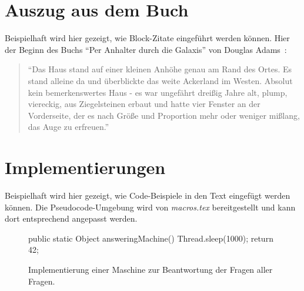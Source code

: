 \begin{appendices}
	\chapter{Auszug aus dem Buch}
	Beispielhaft wird hier gezeigt, wie Block-Zitate eingeführt werden können. Hier der Beginn des Buchs "`Per Anhalter durch die Galaxis"' von Douglas Adams~\cite{adams1998anhalter_inbook}:
	
	\begin{quote}
	"`Das Haus stand auf einer kleinen Anhöhe genau am Rand des Ortes. Es stand alleine da und überblickte das weite Ackerland im Westen. Absolut kein bemerkenswertes Haus - es war ungefährt dreißig Jahre alt, plump, viereckig, aus Ziegelsteinen erbaut und hatte vier Fenster an der Vorderseite, der es nach Größe und Proportion mehr oder weniger mißlang, das Auge zu erfreuen."'
	\end{quote}
	
	\chapter{Implementierungen}
	Beispielhaft wird hier gezeigt, wie Code-Beispiele in den Text eingefügt werden können. Die Pseudocode-Umgebung wird von \emph{macros.tex} bereitgestellt und kann dort entsprechend angepasst werden.
			\begin{figure}[ht]
			\centering
			\begin{minipage}{11cm}
				\begin{pseudocode}
public static Object answeringMachine() {
	Thread.sleep(1000);
	return 42;
}
				\end{pseudocode}
				\caption{Implementierung einer Maschine zur Beantwortung der Fragen aller Fragen.}
				\label{IMG_PID}
			\end{minipage}
		\end{figure}
	
\end{appendices}